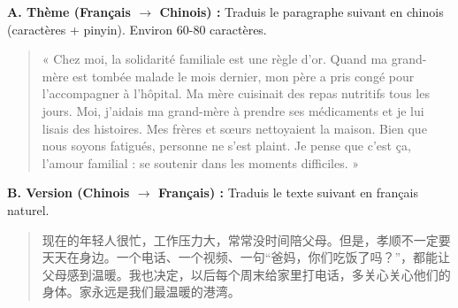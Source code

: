 \documentclass[11pt]{article}
\newenvironment{zhbox}{\begin{quote}}{\end{quote}}
\begin{document}
\begin{exercice}
\textbf{A. Thème (Français $\rightarrow$ Chinois) :} Traduis le paragraphe suivant en chinois (caractères + pinyin). Environ 60-80 caractères.
\begin{quote}
« Chez moi, la solidarité familiale est une règle d'or. Quand ma grand-mère est tombée malade le mois dernier, mon père a pris congé pour l'accompagner à l'hôpital. Ma mère cuisinait des repas nutritifs tous les jours. Moi, j'aidais ma grand-mère à prendre ses médicaments et je lui lisais des histoires. Mes frères et sœurs nettoyaient la maison. Bien que nous soyons fatigués, personne ne s'est plaint. Je pense que c'est ça, l'amour familial : se soutenir dans les moments difficiles. »
\end{quote}

\textbf{B. Version (Chinois $\rightarrow$ Français) :} Traduis le texte suivant en français naturel.
\begin{zhbox}
现在的年轻人很忙，工作压力大，常常没时间陪父母。但是，孝顺不一定要天天在身边。一个电话、一个视频、一句“爸妈，你们吃饭了吗？”，都能让父母感到温暖。我也决定，以后每个周末给家里打电话，多关心关心他们的身体。家永远是我们最温暖的港湾。
\end{zhbox}
\end{exercice}
\end{document}
